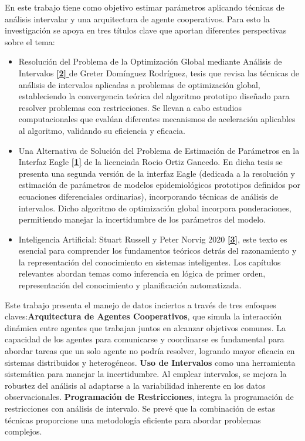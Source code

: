 \documentclass{article}
\begin{document}
En este trabajo tiene como objetivo estimar parámetros aplicando técnicas de análisis intervalar y una arquitectura de agente cooperativos. Para esto la investigación se apoya en tres títulos clave que aportan diferentes perspectivas sobre el tema:
\begin{itemize}
\item Resolución del Problema de la Optimización Global mediante Análisis de Intervalos \hyperref[sec:2]{ \textbf{[2] }} de Greter Domínguez Rodríguez, tesis que revisa las técnicas de análisis de intervalos aplicadas a problemas de optimización global, estableciendo la convergencia teórica del algoritmo prototipo diseñado para resolver problemas con restricciones. Se llevan a cabo estudios computacionales que evalúan diferentes mecanismos de aceleración aplicables al algoritmo, validando su eficiencia y eficacia.

\item Una Alternativa de Solución del Problema de Estimación de Parámetros en la Interfaz Eagle \hyperref[sec:1]{ \textbf{ [1]}} de la licenciada Rocio Ortiz Gancedo. En dicha tesis se presenta una segunda versión de la interfaz Eagle (dedicada a la resolución y estimación de parámetros de modelos epidemiológicos prototipos definidos por ecuaciones diferenciales ordinarias), incorporando técnicas de análisis de intervalos. Dicho algoritmo de optimización global incorpora ponderaciones, permitiendo manejar la incertidumbre de los parámetros del modelo.

\item Inteligencia Artificial: Stuart Russell y Peter Norvig 2020 \hyperref[sec:3]{ \textbf{[3]}}, este texto es esencial para comprender los fundamentos teóricos detrás del razonamiento y la representación del conocimiento en sistemas inteligentes. Los capítulos relevantes abordan temas como inferencia en lógica de primer orden, representación del conocimiento y planificación automatizada.

\end{itemize}

Este trabajo presenta el manejo de datos inciertos a través de tres enfoques claves:\textbf{Arquitectura de Agentes Cooperativos}, que simula la interacción dinámica entre agentes que trabajan juntos en alcanzar objetivos comunes. La capacidad de los agentes para comunicarse y coordinarse es fundamental para abordar tareas que un solo agente no podría resolver, logrando mayor eficacia en sistemas distribuidos y heterogéneos. \textbf{Uso de Intervalos} como una herramienta sistemática para manejar la incertidumbre. Al emplear intervalos, se mejora la robustez del análisis al adaptarse a la variabilidad inherente en los datos observacionales. \textbf{Programación de Restricciones}, integra la programación de restricciones con análisis de intervalo. Se prevé que la combinación de estas técnicas proporcione una metodología eficiente para abordar problemas complejos.
\end{document}
